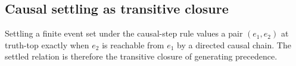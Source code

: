\subsection{Causal settling as transitive closure}

\begin{theorem}\label{thm:causal-settling-transitive-closure}\leanok{}
Settling a finite event set under the causal-step rule values a pair
$(e_1,e_2)$ at truth-top exactly when $e_2$ is reachable from $e_1$ by a
directed causal chain. The settled relation is therefore the transitive
closure of generating precedence.
\end{theorem}
